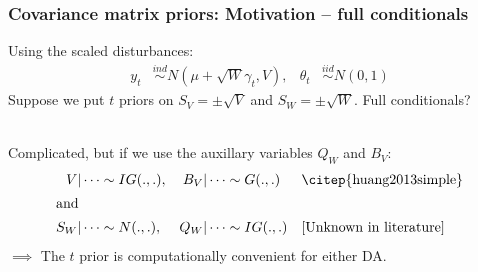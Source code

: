 \documentclass[xcolor=dvipsnames]{beamer}
\begin{document}
\begin{frame}
\frametitle{Covariance matrix priors: Motivation -- full conditionals}
Using the scaled disturbances:
\begin{align*}
 y_t &\stackrel{ind}{\sim} N(\mu + \sqrt{W}\gamma_t, V), & \theta_t &\stackrel{iid}{\sim} N(0,1)
\end{align*}
Suppose we put $t$ priors on $S_V=\pm\sqrt{V}$ and $S_W=\pm\sqrt{W}$. Full conditionals?\\~ \pause

Complicated, but if we use the auxillary variables $Q_W$ and $B_V$:
\begin{align*}
V|\cdots  &\sim IG(.,.), & B_V|\cdots  & \sim G(.,.) &&\mbox{\citep{huang2013simple}}\\%
\intertext{and}
S_W|\cdots  &\sim N(.,.),  &Q_W|\cdots  &\sim IG(.,.) &&\mbox{[Unknown in literature]}%
\end{align*}
\pause $\implies$ The $t$ prior is computationally convenient for either DA.
\end{frame}
\end{document}
